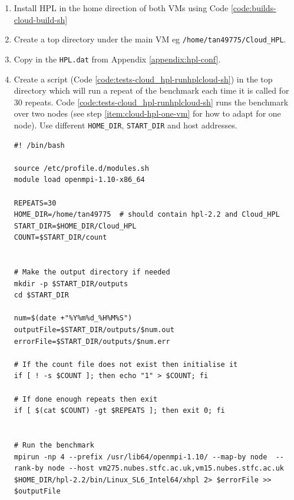 \documentclass{article}
\newenvironment{code}{\captionsetup{type=listing}}{}
\begin{document}
            \begin{enumerate}
                \item \label{item:cloud-hpl-repeat-start} Install HPL in the home direction of both VMs using Code \ref{code:builds-cloud-build-sh}

                \item Create a top directory under the main VM eg \verb|/home/tan49775/Cloud_HPL|.

                \item Copy in the \verb|HPL.dat| from Appendix \ref{appendix:hpl-conf}.

                \item Create a script (Code \ref{code:tests-cloud_hpl-runhplcloud-sh}) in the top directory which will run a repeat of the benchmark each time it is called for 30 repeats. Code \ref{code:tests-cloud_hpl-runhplcloud-sh} runs the benchmark over two nodes (see step \ref{item:cloud-hpl-one-vm} for how to adapt for one node). Use different \verb|HOME_DIR|, \verb|START_DIR| and host addresses.

                    \begin{code}
                    \label{code:tests-cloud_hpl-runhplcloud-sh}
                    \begin{verbatim}
#! /bin/bash

source /etc/profile.d/modules.sh
module load openmpi-1.10-x86_64

REPEATS=30
HOME_DIR=/home/tan49775  # should contain hpl-2.2 and Cloud_HPL
START_DIR=$HOME_DIR/Cloud_HPL
COUNT=$START_DIR/count


# Make the output directory if needed
mkdir -p $START_DIR/outputs
cd $START_DIR

num=$(date +"%Y%m%d_%H%M%S")
outputFile=$START_DIR/outputs/$num.out
errorFile=$START_DIR/outputs/$num.err

# If the count file does not exist then initialise it
if [ ! -s $COUNT ]; then echo "1" > $COUNT; fi

# If done enough repeats then exit
if [ $(cat $COUNT) -gt $REPEATS ]; then exit 0; fi


# Run the benchmark
mpirun -np 4 --prefix /usr/lib64/openmpi-1.10/ --map-by node  --rank-by node --host vm275.nubes.stfc.ac.uk,vm15.nubes.stfc.ac.uk $HOME_DIR/hpl-2.2/bin/Linux_SL6_Intel64/xhpl 2> $errorFile >> $outputFile


\end{verbatim}
\end{code}
\end{enumerate}
\end{document}
